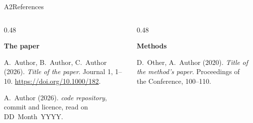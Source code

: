 \begin{frame}{A2\enspace References}
  \begin{columns}[T,onlytextwidth]
  \begin{column}{0.48\textwidth}
  \scriptsize\setlength\parskip{0.6mm}\raggedright
  \textbf{The paper}\par
  A.~Author, B.~Author, C.~Author (2026). \emph{Title of the paper}. Journal 1, 1--10.
  \url{https://doi.org/10.1000/182}.\par
  A.~Author (2026). \emph{code repository}, commit and licence, read on DD~Month~YYYY.\par
  \end{column}
  \begin{column}{0.48\textwidth}
  \scriptsize\setlength\parskip{0.6mm}\raggedright
  \textbf{Methods}\par
  D.~Other, A.~Author (2020). \emph{Title of the method's paper}. Proceedings of the Conference,
  100--110.\par
  \end{column}
  \end{columns}
\end{frame}
